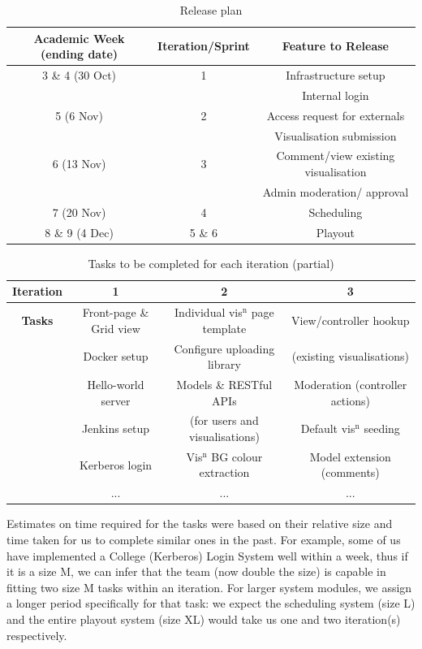 ﻿\documentclass[a4paper, titlepage]{article}
\begin{document}
\begin{table}[h]
  \begin{center}
  \begin{tabular}{c | c | c}
     \textbf{Academic Week (ending date)} & \textbf{Iteration/Sprint} & \textbf{Feature to Release} \\ \hline
     3 \& 4 (30 Oct) & 1 & Infrastructure setup \\
      & & Internal login \\
     5 (6 Nov) & 2 & Access request for externals \\
      & & Visualisation submission \\
     6 (13 Nov) & 3 & Comment/view existing visualisation \\
      & & Admin moderation/ approval \\
     7 (20 Nov) & 4 & Scheduling \\
     8 \& 9 (4 Dec) & 5 \& 6 & Playout \\
  \end{tabular}
  \end{center}
  \caption{Release plan}
  \label{tab:projman_rplan}
\end{table}

\begin{table}[h]
  \begin{tabular}{c | c | c | c }
    \textbf{Iteration} & 1 & 2 & 3 \\ \hline
   \textbf{Tasks} & Front-page \& Grid view & Individual vis$^\textrm{n}$ page template & View/controller hookup\\
      & Docker setup & Configure uploading library & (existing visualisations)\\
      & Hello-world server & Models \& RESTful APIs& Moderation (controller actions)\\
      & Jenkins setup & (for users and visualisations)& Default vis$^\textrm{n}$ seeding\\
      & Kerberos login& Vis$^\textrm{n}$ BG colour extraction & Model extension (comments)\\
      & ... & ... & ...
  \end{tabular}
  \caption{Tasks to be completed for each iteration (partial)}
  \label{tab:projman_iplan}
\end{table}


Estimates on time required for the tasks were based on their relative size and
time taken for us to complete similar ones in the past. For example, some of us
have implemented a College (Kerberos) Login System well within a week, thus if
it is a size M, we can infer that the team (now double the size) is capable in 
fitting two size M tasks within an iteration. For larger system modules, we
assign a longer period specifically for that task: we expect the scheduling
system (size L) and the entire playout system (size XL) would take us one and
two iteration(s) respectively.
\end{document}
